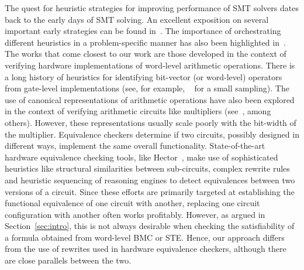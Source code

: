 The quest for heuristic strategies for improving performance of
SMT solvers dates back to the early days of SMT solving.  An excellent
exposition on several important early strategies can be found
in~\cite{barrett}.  The importance of orchestrating different
heuristics in a problem-specific manner has also been highlighted
in~\cite{deMoura2013}. %
The works that come closest to our work are those developed in the
context of verifying hardware implementations of word-level arithmetic
operations.  There is a long history of heuristics for identifying
bit-vector (or word-level) operators from gate-level implementations
(see, for example,
~\cite{kunz,ciesielski,reveng,earlier-pat-match-synopsys} for a small
sampling).  The use of canonical representations of arithmetic
operations have also been explored in the context of verifying
arithmetic circuits like multipliers (see~\cite{bmd,drechsler}, among
others).  However, these representations usually scale poorly with the
bit-width of the multiplier.  Equivalence checkers determine if two
circuits, possibly designed in different ways, implement the same
overall functionality.  State-of-the-art hardware equivalence checking
tools, like Hector~\cite{hector}, make use of sophisticated heuristics
like structural similarities between sub-circuits, complex rewrite
rules and heuristic sequencing of reasoning engines to detect
equivalences between two versions of a circuit.  %
Since these efforts are primarily
targeted at establishing the functional equivalence of one circuit
with another, replacing one circuit configuration with another often
works profitably.  However, as argued in Section~\ref{sec:intro}, this
is not always desirable when checking the satisfiability of a formula
obtained from word-level BMC or STE.  Hence, our approach differs from
the use of rewrites used in hardware equivalence checkers, although
there are close parallels between the two. %

